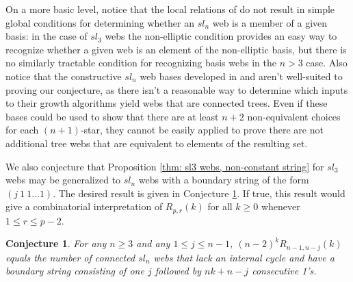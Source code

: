 \documentclass[documentfleqn,12pt]{amsart}
\newtheorem{conjecture}[theorem]{Conjecture}
\begin{document}
On a more basic level, notice that the local relations of \cite{CKM} do not result in simple global conditions for determining whether an $sl_n$ web is a member of a given basis: in the case of $sl_3$ webs the non-elliptic condition provides an easy way to recognize whether a given web is an element of the non-elliptic basis, but there is no similarly tractable condition for recognizing basis webs in the $n>3$ case.  Also notice that the constructive $sl_n$ web bases developed in \cite{West} and \cite{Fon} aren't well-suited to proving our conjecture, as there isn't a reasonable way to determine which inputs to their growth algorithms yield webs that are connected trees.  Even if these bases could be used to show that there are at least $n+2$ non-equivalent choices for each $(n+1)$-star, they cannot be easily applied to prove there are not additional tree webs that are equivalent to elements of the resulting set.

We also conjecture that Proposition \ref{thm: sl3 webs, non-constant string} for $sl_3$ webs may be generalized to $sl_n$ webs with a boundary string of the form $(j \ 1 \ 1 \hdots 1)$.  The desired result is given in Conjecture \ref{thm: sln webs, non-constant}.  If true, this result would give a combinatorial interpretation of $R_{p,r}(k)$ for all $k \geq 0$ whenever $1 \leq r \leq p-2$.  

\begin{conjecture}
\label{thm: sln webs, non-constant}
For any $n \geq 3$ and any $1 \leq j \leq n-1$, $(n-2)^k R_{n-1,n-j}(k)$ equals the number of connected $sl_n$ webs that lack an internal cycle and have a boundary string consisting of one $j$ followed by $nk + n - j$ consecutive 1's.
\end{conjecture}




\end{document}
